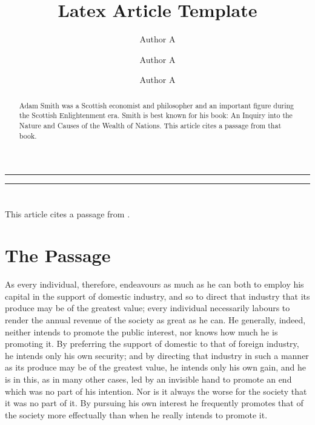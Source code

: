 \documentclass[10 pt,a4paper]{article}
\title{\LARGE Latex Article Template}
\date{}
\author[1]{Author A}
\author[2]{Author A}
\author[3]{Author A}
\affil[1]{\it\small Department of Economics, University 1, ...}
\affil[2]{\it\small Department of Statistics, University 2, ...}
\affil[3]{\it\small Department of Mathematics, University 3, ...}
\begin{document}
\maketitle
\thispagestyle{empty}

\par\noindent\rule{\textwidth}{0.4pt} %
\begin{abstract}
Adam Smith was a Scottish economist and philosopher and an important figure during the Scottish Enlightenment era. Smith is best known for his book: An Inquiry into the Nature and Causes of the Wealth of Nations. This article cites a passage from that book.
\end{abstract}
\par\noindent\rule{\textwidth}{0.4pt} %
\vspace*{-1.7cm} %

\section*{} %

This article cites a passage from \citet{smith1827inquiry}.
 
\section{The Passage}

As every individual, therefore, endeavours as much as he can both to employ his capital in the support of domestic industry, and so to direct that industry that its produce may be of the greatest value; every individual necessarily labours to render the annual revenue of the society as great as he can. He generally, indeed, neither intends to promote the public interest, nor knows how much he is promoting it. By preferring the support of domestic to that of foreign industry, he intends only his own security; and by directing that industry in such a manner as its produce may be of the greatest value, he intends only his own gain, and he is in this, as in many other cases, led by an invisible hand to promote an end which was no part of his intention. Nor is it always the worse for the society that it was no part of it. By pursuing his own interest he frequently promotes that of the society more effectually than when he really intends to promote it.



\end{document}
